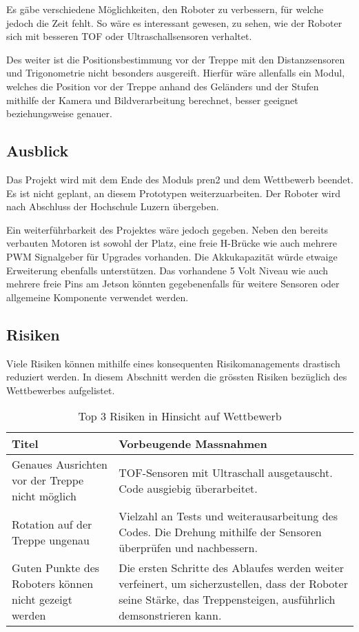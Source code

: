 Es gäbe verschiedene Möglichkeiten, den Roboter zu verbessern, für welche jedoch die Zeit fehlt. So wäre es interessant gewesen, zu sehen, wie der Roboter sich mit besseren TOF oder Ultraschallsensoren verhaltet. 

Des weiter ist die Positionsbestimmung vor der Treppe mit den Distanzsensoren und Trigonometrie nicht besonders ausgereift. Hierfür wäre allenfalls ein Modul, welches die Position vor der Treppe anhand des Geländers und der Stufen mithilfe der Kamera und Bildverarbeitung berechnet, besser geeignet beziehungsweise genauer.


\subsection{Ausblick}

Das Projekt wird mit dem Ende des Moduls \acrshort{pren2} und dem Wettbewerb beendet. Es ist nicht geplant, an diesem Prototypen weiterzuarbeiten. Der Roboter wird nach Abschluss der Hochschule Luzern übergeben.

Ein weiterführbarkeit des Projektes wäre jedoch gegeben. Neben den bereits verbauten Motoren ist sowohl der Platz, eine freie H-Brücke wie auch mehrere PWM Signalgeber für Upgrades vorhanden. Die Akkukapazität würde etwaige Erweiterung ebenfalls unterstützen. Das vorhandene 5 Volt Niveau wie auch mehrere freie Pins am Jetson könnten gegebenenfalls für weitere Sensoren oder allgemeine Komponente verwendet werden.

\newpage

\subsection{Risiken}

Viele Risiken können mithilfe eines konsequenten Risikomanagements drastisch reduziert werden. In diesem Abschnitt werden die grössten Risiken bezüglich des Wettbewerbes aufgelistet.

\begin{center}
\begin{table}[H]
    \begin{tabularx}{\textwidth}{|X|X|}
        \hline
        \textbf{Titel} & \textbf{Vorbeugende Massnahmen} \\ \hline
        Genaues Ausrichten vor der Treppe nicht möglich & TOF-Sensoren mit Ultraschall ausgetauscht. Code ausgiebig überarbeitet. \\ \hline
        Rotation auf der Treppe ungenau & Vielzahl an Tests und weiterausarbeitung des Codes. Die Drehung mithilfe der Sensoren überprüfen und nachbessern.
        \\ \hline
       Guten Punkte des Roboters können nicht gezeigt werden & Die ersten Schritte des Ablaufes werden weiter verfeinert, um sicherzustellen, dass der Roboter seine Stärke, das Treppensteigen, ausführlich demsonstrieren kann. 
       \\ \hline
    \end{tabularx}
    \caption{Top 3 Risiken in Hinsicht auf Wettbewerb}
    \label{tab: }
\end{table}
\end{center}
